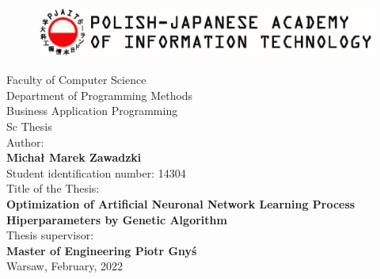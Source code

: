 \documentclass[a4paper,12pt]{article}
\numberwithin{figure}{section}
\begin{document}
    \newpage

    \thispagestyle{empty}

    \begin{figure}[H]
        \label{fig:pjatk_logo_en}
        \centering
        \includegraphics[width=\textwidth]{pjatk_logo_en}
    \end{figure}

    \begin{center}

        \vspace{0.5cm}
        \large
        Faculty of Computer Science \\

        \vspace{0.2cm}
        \large
        Department of Programming Methods \\

        \vspace{0.2cm}
        \large
        Business Application Programming  \\

        \vspace{1cm}
        \LARGE
        Sc Thesis \\

        \vspace{1.2cm}
        \normalsize
        Author: \\
        \vspace{.3cm}
        \large
        \textbf{Michał Marek Zawadzki} \\
        Student identification number: 14304 \\

        \vspace{1.2cm}
        \normalsize
        Title of the Thesis: \\
        \vspace{.3cm}
        \LARGE
        \textbf{Optimization of Artificial Neuronal Network Learning Process Hiperparameters by Genetic Algorithm} \\

        \vspace{1.2cm}
        \normalsize
        Thesis supervisor: \\
        \vspace{.3cm}
        \large
        \textbf{Master of Engineering Piotr Gnyś} \\

        \vspace{1.6cm}
        \normalsize
        Warsaw, February, 2022 \\

    \end{center}
\end{document}
